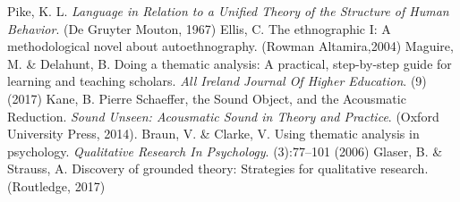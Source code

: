 \documentclass[runningheads,a4paper]{cmmr2023}
\begin{document}
\begin{thebibliography}{4}
Pike, K. L. {\em Language in Relation to a Unified Theory of the Structure of Human Behavior}. (De Gruyter Mouton, 1967)
Ellis, C. The ethnographic I: A methodological novel about autoethnography. (Rowman Altamira,2004)
Maguire, M. \& Delahunt, B. Doing a thematic analysis: A practical, step-by-step guide for learning and teaching scholars. {\em All Ireland Journal Of Higher Education}. (9) (2017)
Kane, B. Pierre Schaeffer, the Sound Object, and the Acousmatic Reduction. {\em Sound Unseen: Acousmatic Sound in Theory and Practice}. (Oxford University Press, 2014).
Braun, V. \& Clarke, V. Using thematic analysis in psychology. {\em Qualitative Research In Psychology}. (3):77--101 (2006)
Glaser, B. \& Strauss, A. Discovery of grounded theory: Strategies for qualitative research. (Routledge, 2017)

\end{thebibliography}
\end{document}
